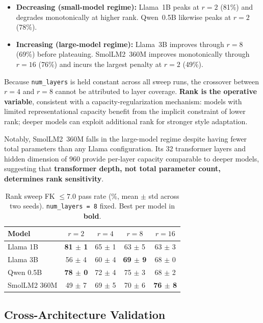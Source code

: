 \documentclass[journal]{IEEEtai}
\begin{document}
\begin{itemize}
    \item \textbf{Decreasing (small-model regime):} Llama~1B peaks at $r=2$ (81\%) and degrades monotonically at higher rank. Qwen~0.5B likewise peaks at $r=2$ (78\%).
    \item \textbf{Increasing (large-model regime):} Llama~3B improves through $r=8$ (69\%) before plateauing. SmolLM2~360M improves monotonically through $r=16$ (76\%) and incurs the largest penalty at $r=2$ (49\%).
\end{itemize}

Because \texttt{num\_layers} is held constant across all sweep runs, the crossover between $r=4$ and $r=8$ cannot be attributed to layer coverage. \textbf{Rank is the operative variable}, consistent with a capacity-regularization mechanism: models with limited representational capacity benefit from the implicit constraint of lower rank; deeper models can exploit additional rank for stronger style adaptation.

Notably, SmolLM2~360M falls in the large-model regime despite having fewer total parameters than any Llama configuration. Its 32 transformer layers and hidden dimension of 960 provide per-layer capacity comparable to deeper models, suggesting that \textbf{transformer depth, not total parameter count, determines rank sensitivity}.

\begin{table}[!t]
  \centering
  \caption{Rank sweep FK $\leq 7.0$ pass rate (\%, mean $\pm$ std across two seeds). \texttt{num\_layers~=~8} fixed. Best per model in \textbf{bold}.}
  \label{tab:ranksweep}
  \small
  \begin{tabular}{lcccc}
    \hline
    Model        & $r=2$               & $r=4$     & $r=8$               & $r=16$ \\
    \hline
    Llama 1B     & \textbf{81 $\pm$ 1} & 65 $\pm$ 1 & 63 $\pm$ 5         & 63 $\pm$ 3 \\
    Llama 3B     & 56 $\pm$ 4          & 60 $\pm$ 4 & \textbf{69 $\pm$ 9} & 68 $\pm$ 0 \\
    Qwen 0.5B    & \textbf{78 $\pm$ 0} & 72 $\pm$ 4 & 75 $\pm$ 3         & 68 $\pm$ 2 \\
    SmolLM2 360M & 49 $\pm$ 7          & 69 $\pm$ 5 & 70 $\pm$ 6         & \textbf{76 $\pm$ 8} \\
    \hline
  \end{tabular}
\end{table}

\subsection{Cross-Architecture Validation}\label{sec:crossarch}
\end{document}
